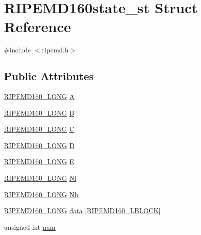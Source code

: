 \hypertarget{struct_r_i_p_e_m_d160state__st}{}\section{R\+I\+P\+E\+M\+D160state\+\_\+st Struct Reference}
\label{struct_r_i_p_e_m_d160state__st}


{\ttfamily \#include $<$ripemd.\+h$>$}

\subsection*{Public Attributes}
\begin{DoxyCompactItemize}
\item 
\hyperlink{ripemd_8h_ad140fdb90a6a782fd82cfbe1a973dc3e}{R\+I\+P\+E\+M\+D160\+\_\+\+L\+O\+NG} \hyperlink{struct_r_i_p_e_m_d160state__st_aff584a2fea5f0d7e0e6417ad82b2105b}{A}
\item 
\hyperlink{ripemd_8h_ad140fdb90a6a782fd82cfbe1a973dc3e}{R\+I\+P\+E\+M\+D160\+\_\+\+L\+O\+NG} \hyperlink{struct_r_i_p_e_m_d160state__st_a13a7eae93311ddac26f72cdc497890c0}{B}
\item 
\hyperlink{ripemd_8h_ad140fdb90a6a782fd82cfbe1a973dc3e}{R\+I\+P\+E\+M\+D160\+\_\+\+L\+O\+NG} \hyperlink{struct_r_i_p_e_m_d160state__st_ab2caeef80f014ab050d680953719d66d}{C}
\item 
\hyperlink{ripemd_8h_ad140fdb90a6a782fd82cfbe1a973dc3e}{R\+I\+P\+E\+M\+D160\+\_\+\+L\+O\+NG} \hyperlink{struct_r_i_p_e_m_d160state__st_afe0e351485e4bd84951f447449743567}{D}
\item 
\hyperlink{ripemd_8h_ad140fdb90a6a782fd82cfbe1a973dc3e}{R\+I\+P\+E\+M\+D160\+\_\+\+L\+O\+NG} \hyperlink{struct_r_i_p_e_m_d160state__st_a236f279b953d3527e5d7466554a7b807}{E}
\item 
\hyperlink{ripemd_8h_ad140fdb90a6a782fd82cfbe1a973dc3e}{R\+I\+P\+E\+M\+D160\+\_\+\+L\+O\+NG} \hyperlink{struct_r_i_p_e_m_d160state__st_a9acc9c92383f29553b952e9eef1f637e}{Nl}
\item 
\hyperlink{ripemd_8h_ad140fdb90a6a782fd82cfbe1a973dc3e}{R\+I\+P\+E\+M\+D160\+\_\+\+L\+O\+NG} \hyperlink{struct_r_i_p_e_m_d160state__st_ab2372dbb5687eeda765406bac59fab6b}{Nh}
\item 
\hyperlink{ripemd_8h_ad140fdb90a6a782fd82cfbe1a973dc3e}{R\+I\+P\+E\+M\+D160\+\_\+\+L\+O\+NG} \hyperlink{struct_r_i_p_e_m_d160state__st_a3277ac96488c067ecd4be06bcc254acc}{data} \mbox{[}\hyperlink{ripemd_8h_a2a4ee496dfe1ef71297132c92c10f71c}{R\+I\+P\+E\+M\+D160\+\_\+\+L\+B\+L\+O\+CK}\mbox{]}
\item 
unsigned int \hyperlink{struct_r_i_p_e_m_d160state__st_acb6e5ff004459b4b8bada376dbc87014}{num}
\end{DoxyCompactItemize}



